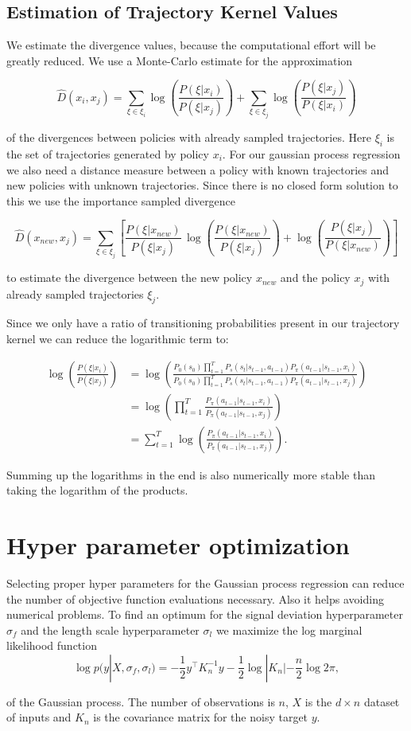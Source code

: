 \subsection{Estimation of Trajectory Kernel Values}

We estimate the divergence values, because the computational effort will be greatly reduced\cite{wilson2014using}. We use a Monte-Carlo estimate for the approximation

$$\hat{D}(x_{ i }, x_{ j }) = \sum _{\xi \in \xi_i} \log\left( \frac{P(\xi|x_{ i })}{P(\xi|x_{ j })} \right) + \sum _{\xi \in \xi_j} \log\left( \frac{P(\xi|x_{ j })}{P(\xi|x_{ i })} \right) $$

of the divergences between policies with already sampled trajectories. Here $\xi_i$ is the set of trajectories generated by policy $x_i$. For our gaussian process regression we also need a distance measure between a policy with known trajectories and new policies with unknown trajectories. Since there is no closed form solution to this we use the importance sampled divergence

$$\hat{D}(x_{ new }, x_{ j }) = \sum _{\xi \in \xi_j} \left[\frac{P(\xi|x_{ new })}{P(\xi|x_{ j })}\,\log\left(\frac{P(\xi|x_{new})}{P(\xi|x_{j})}\right)+\log\left(\frac{P(\xi|x_{ j })}{P(\xi|x_{ new })}\right)\right] $$

to estimate the divergence between the new policy $x_{new}$ and the policy $x_j$ with already sampled trajectories $\xi_j$.

Since we only have a ratio of transitioning probabilities present in our trajectory kernel we can reduce the logarithmic term to:

\begin{align*}
    \log\left(\frac{P(\xi|x_i)}{P(\xi|x_j)}\right)
    &= \log\left(\frac{P_{0}(s_{0}) \prod_{t=1}^{T} P_s(s_{t}|s_{t-1},a_{t-1}) P_{\pi}(a_{t-1}|s_{t-1},x_i)}{P_{0}(s_{0}) \prod_{t=1}^{T} P_s(s_{t}|s_{t-1},a_{t-1}) P_{\pi}(a_{t-1}|s_{t-1},x_j)}\right)\\
    &= \log\left(\prod_{t=1}^{T}\frac{ P_{\pi}(a_{t-1}|s_{t-1},x_i)}{P_{\pi}(a_{t-1}|s_{t-1},x_j)}\right)\\
    &= \sum_{t=1}^{T} \log \left(\frac{P_{\pi}(a_{t-1}|s_{t-1},x_i)}{P_{\pi}(a_{t-1}|s_{t-1},x_j)}\right).
\end{align*}


Summing up the logarithms in the end is also numerically more stable than taking the logarithm of the products.

\section{Hyper parameter optimization}
Selecting proper hyper parameters for the Gaussian process regression can reduce the number of objective function evaluations necessary. Also it helps avoiding numerical problems. To find an optimum for the signal deviation hyperparameter $\sigma_f$ and the length scale hyperparameter $\sigma_l$ we maximize the log marginal likelihood function
\begin{equation} \label{eq:hypOpt}
    \log p(y|X,\sigma_f,\sigma_l) = -\frac{1}{2} y^\top K_n^{-1} y -\frac{1}{2} \log |K_n| -\frac{n}{2}\log 2\pi ,
\end{equation}

of the Gaussian process. The number of observations is $n$, $X$ is the $d \times n$ dataset of inputs and $K_n$ is the covariance matrix for the noisy target $y$.
